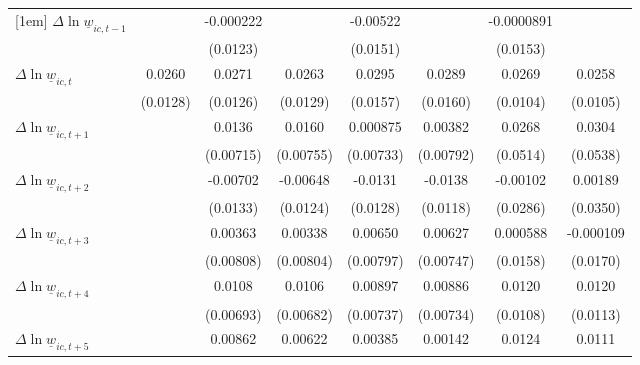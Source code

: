 {\begin{tabular}{l*{7}{c}}
[1em]
$\Delta \ln \underline{w}_{ic,t-1}$&                  &-0.000222         &                  & -0.00522         &                  &-0.0000891         &                  \\
          &                  & (0.0123)         &                  & (0.0151)         &                  & (0.0153)         &                  \\
[1em]
$\Delta \ln \underline{w}_{ic,t}$&   0.0260\sym{**} &   0.0271\sym{**} &   0.0263\sym{**} &   0.0295\sym{*}  &   0.0289\sym{*}  &   0.0269\sym{**} &   0.0258\sym{**} \\
          & (0.0128)         & (0.0126)         & (0.0129)         & (0.0157)         & (0.0160)         & (0.0104)         & (0.0105)         \\
[1em]
$\Delta \ln \underline{w}_{ic,t+1}$&                  &   0.0136\sym{*}  &   0.0160\sym{**} & 0.000875         &  0.00382         &   0.0268         &   0.0304         \\
          &                  &(0.00715)         &(0.00755)         &(0.00733)         &(0.00792)         & (0.0514)         & (0.0538)         \\
[1em]
$\Delta \ln \underline{w}_{ic,t+2}$&                  & -0.00702         & -0.00648         &  -0.0131         &  -0.0138         & -0.00102         &  0.00189         \\
          &                  & (0.0133)         & (0.0124)         & (0.0128)         & (0.0118)         & (0.0286)         & (0.0350)         \\
[1em]
$\Delta \ln \underline{w}_{ic,t+3}$&                  &  0.00363         &  0.00338         &  0.00650         &  0.00627         & 0.000588         &-0.000109         \\
          &                  &(0.00808)         &(0.00804)         &(0.00797)         &(0.00747)         & (0.0158)         & (0.0170)         \\
[1em]
$\Delta \ln \underline{w}_{ic,t+4}$&                  &   0.0108         &   0.0106         &  0.00897         &  0.00886         &   0.0120         &   0.0120         \\
          &                  &(0.00693)         &(0.00682)         &(0.00737)         &(0.00734)         & (0.0108)         & (0.0113)         \\
[1em]
$\Delta \ln \underline{w}_{ic,t+5}$&                  &  0.00862         &  0.00622         &  0.00385         &  0.00142         &   0.0124         &   0.0111         \\

\end{tabular}}
